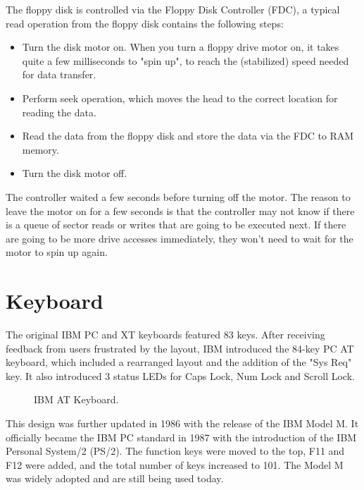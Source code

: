 \documentclass[book.tex]{subfiles}
\begin{document}
\par
The floppy disk is controlled via the Floppy Disk Controller (FDC), a typical read operation from the floppy disk contains the following steps:
\begin{itemize}
  \item Turn the disk motor on. When you turn a floppy drive motor on, it takes quite a few milliseconds to "spin up", to reach the (stabilized) speed needed for data transfer.
  \item Perform seek operation, which moves the head to the correct location for reading the data.
  \item Read the data from the floppy disk and store the data via the FDC to RAM memory.
  \item Turn the disk motor off. 
\end{itemize}

The controller waited a few seconds before turning off the motor. The reason to leave the motor on for a few seconds is that the controller may not know if there is a queue of sector reads or writes that are going to be executed next. If there are going to be more drive accesses immediately, they won't need to wait for the motor to spin up again.\\

\section{Keyboard}
The original IBM PC and XT keyboards featured 83 keys. After receiving feedback from users frustrated by the layout, IBM introduced the 84-key PC AT keyboard, which included a rearranged layout and the addition of the "Sys Req" key. It also introduced 3 status LEDs for Caps Lock, Num Lock and Scroll Lock.\\

\begin{figure}[H] 
  \centering 
  \caption{IBM AT Keyboard.}
\end{figure}

\par
This design was further updated in 1986 with the release of the IBM Model M. It officially became the IBM PC standard in 1987 with the introduction of the IBM Personal System/2 (PS/2). The function keys were moved to the top, F11 and F12 were added, and the total number of keys increased to 101. The Model M was widely adopted and are still being used today.\\
\end{document}
